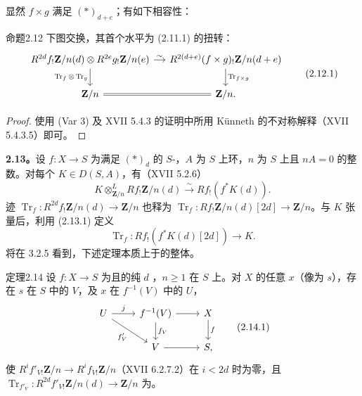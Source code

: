 显然 $f\times g$ 满足 $(*)_{d+e}$；有如下相容性：
\begin{SGAresult}{命题}{2.12}
下图交换，其首个水平为 (2.11.1) 的扭转：
\[\begin{tikzcd}[column sep=small]
R^{2d}f_!\mathbf Z/n(d)\otimes R^{2e}g_!\mathbf Z/n(e)\arrow[r,"\sim"]\arrow[d,"\operatorname{Tr}_f\otimes\operatorname{Tr}_g"']&R^{2(d+e)}(f\times g)_!\mathbf Z/n(d+e)\arrow[d,"\operatorname{Tr}_{f\times g}"]\\\mathbf Z/n\arrow[r,equal]&\mathbf Z/n.
\end{tikzcd}\tag{2.12.1}\]
\end{SGAresult}
\begin{proof}
使用 (Var 3) 及 XVII 5.4.3 的证明中所用 Künneth 的不对称解释（XVII 5.4.3.5）即可。
\end{proof}
\textbf{2.13。}设 $f:X\to S$ 为满足 $(*)_d$ 的 $S$-，$A$ 为 $S$ 上环，$n$ 为 $S$ 上且 $nA=0$ 的整数。对每个 $K\in D(S,A)$，有（XVII 5.2.6）
\[K\mathbin{\otimes^L_{\mathbf Z/n}}Rf_!\mathbf Z/n(d)\xrightarrow\sim Rf_!(f^*K(d)).\tag{2.13.1}\]
迹 $\operatorname{Tr}_f:R^{2d}f_!\mathbf Z/n(d)\to\mathbf Z/n$ 也释为 $\operatorname{Tr}_f:Rf_!\mathbf Z/n(d)[2d]\to\mathbf Z/n$。与 $K$ 张量后，利用 (2.13.1) 定义
\[\operatorname{Tr}_f:Rf_!(f^*K(d)[2d])\to K.\tag{2.13.2}\]
将在 3.2.5 看到，下述定理本质上于的整体。
\begin{SGAresult}{定理}{2.14}
设 $f:X\to S$ 为且的纯 $d$ ，$n\ge1$ 在 $S$ 上。对 $X$ 的任意 $x$（像为 $s$），存在 $s$ 在 $S$ 中的 $V$，及 $x$ 在 $f^{-1}(V)$ 中的 $U$，
\[\begin{tikzcd}U\arrow[r,"j"]\arrow[dr,"f'_V"']&f^{-1}(V)\arrow[r]\arrow[d,"f_V"]&X\arrow[d,"f"]\\&V\arrow[r]&S,
\end{tikzcd}\tag{2.14.1}\]
使 $R^if'_{V!}\mathbf Z/n\to R^if_{V!}\mathbf Z/n$（XVII 6.2.7.2）在 $i<2d$ 时为零，且 $\operatorname{Tr}_{f'_V}:R^{2d}f'_{V!}\mathbf Z/n(d)\to\mathbf Z/n$ 为。
\end{SGAresult}
